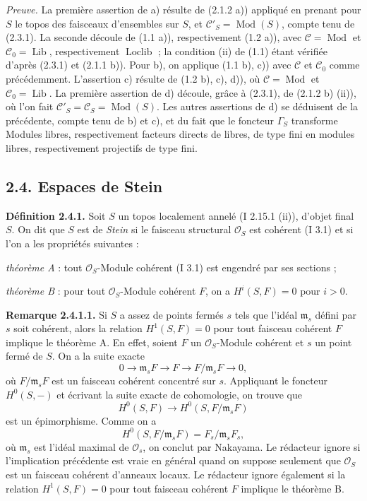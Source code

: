 \documentclass[11pt]{article}
\providecommand{\Mod}{\operatorname{Mod}}
\providecommand{\Lib}{\operatorname{Lib}}
\providecommand{\Loclib}{\operatorname{Loclib}}
\begin{document}
\emph{Preuve.} La première assertion de a) résulte de (2.1.2 a)) appliqué en prenant pour $S$ le topos des faisceaux d'ensembles sur $S$, et $\mathcal C'_S=\Mod(S)$, compte tenu de (2.3.1). La seconde découle de (1.1 a)), respectivement (1.2 a)), avec $\mathcal C=\Mod$ et $\mathcal C_0=\Lib$, respectivement $\Loclib$ ; la condition (ii) de (1.1) étant vérifiée d'après (2.3.1) et (2.1.1 b)). Pour b), on applique (1.1 b), c)) avec $\mathcal C$ et $\mathcal C_0$ comme précédemment. L'assertion c) résulte de (1.2 b), c), d)), où $\mathcal C=\Mod$ et $\mathcal C_0=\Lib$. La première assertion de d) découle, grâce à (2.3.1), de (2.1.2 b) (ii)), où l'on fait $\mathcal C'_S=\mathcal C_S=\Mod(S)$. Les autres assertions de d) se déduisent de la précédente, compte tenu de b) et c), et du fait que le foncteur $\Gamma_S$ transforme Modules libres, respectivement facteurs directs de libres, de type fini en modules libres, respectivement projectifs de type fini.

\subsection*{2.4. Espaces de Stein}

\textbf{Définition 2.4.1.} Soit $S$ un topos localement annelé (I 2.15.1 (ii)), d'objet final $S$. On dit que $S$ est de \emph{Stein} si le faisceau structural $\mathcal O_S$ est cohérent (I 3.1) et si l'on a les propriétés suivantes :

\emph{théorème A} : tout $\mathcal O_S$-Module cohérent (I 3.1) est engendré par ses sections ;

\emph{théorème B} : pour tout $\mathcal O_S$-Module cohérent $F$, on a $H^i(S,F)=0$ pour $i>0$.

\textbf{Remarque 2.4.1.1.} Si $S$ a assez de points fermés $s$ tels que l'idéal $\mathfrak m_s$ défini par $s$ soit cohérent, alors la relation $H^1(S,F)=0$ pour tout faisceau cohérent $F$ implique le théorème A. En effet, soient $F$ un $\mathcal O_S$-Module cohérent et $s$ un point fermé de $S$. On a la suite exacte
\[
0\longrightarrow\mathfrak m_sF\longrightarrow F\longrightarrow F/\mathfrak m_sF\longrightarrow0,
\]
où $F/\mathfrak m_sF$ est un faisceau cohérent concentré sur $s$. Appliquant le foncteur $H^0(S,-)$ et écrivant la suite exacte de cohomologie, on trouve que
\[
H^0(S,F)\longrightarrow H^0(S,F/\mathfrak m_sF)
\]
est un épimorphisme. Comme on a
\[
H^0(S,F/\mathfrak m_sF)=F_s/\mathfrak m_sF_s,
\]
où $\mathfrak m_s$ est l'idéal maximal de $\mathcal O_s$, on conclut par Nakayama. Le rédacteur ignore si l'implication précédente est vraie en général quand on suppose seulement que $\mathcal O_S$ est un faisceau cohérent d'anneaux locaux. Le rédacteur ignore également si la relation $H^1(S,F)=0$ pour tout faisceau cohérent $F$ implique le théorème B.
\end{document}
